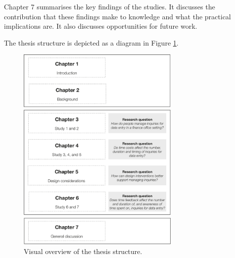 Chapter 7 summarises the key findings of the studies. It discusses the contribution that these findings make to knowledge and what the practical implications are. It also discusses opportunities for future work. 

The thesis structure is depicted as a diagram in Figure \ref{fig:ch1-thesisoverview}.

\begin{figure}
\centering
\includegraphics[width=0.7\textwidth]{images/ThesisOverview.pdf}
\caption{Visual overview of the thesis structure.}
\label{fig:ch1-thesisoverview}
\end{figure}

